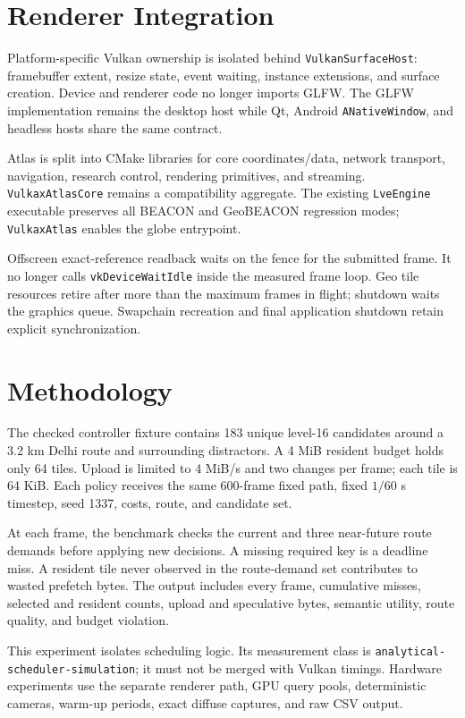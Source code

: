 \documentclass[12pt]{article}
\begin{document}
\section{Renderer Integration}
Platform-specific Vulkan ownership is isolated behind \texttt{VulkanSurfaceHost}: framebuffer
extent, resize state, event waiting, instance extensions, and surface creation. Device and renderer
code no longer imports GLFW. The GLFW implementation remains the desktop host while Qt, Android
\texttt{ANativeWindow}, and headless hosts share the same contract.

Atlas is split into CMake libraries for core coordinates/data, network transport, navigation,
research control, rendering primitives, and streaming. \texttt{VulkaxAtlasCore} remains a
compatibility aggregate. The existing \texttt{LveEngine} executable preserves all BEACON and
GeoBEACON regression modes; \texttt{VulkaxAtlas} enables the globe entrypoint.

Offscreen exact-reference readback waits on the fence for the submitted frame. It no longer calls
\texttt{vkDeviceWaitIdle} inside the measured frame loop. Geo tile resources retire after more than
the maximum frames in flight; shutdown waits the graphics queue. Swapchain recreation and final
application shutdown retain explicit synchronization.

\section{Methodology}
The checked controller fixture contains 183 unique level-16 candidates around a 3.2 km Delhi route
and surrounding distractors. A 4 MiB resident budget holds only 64 tiles. Upload is limited to
4 MiB/s and two changes per frame; each tile is 64 KiB. Each policy receives the same 600-frame
fixed path, fixed $1/60$ s timestep, seed 1337, costs, route, and candidate set.

At each frame, the benchmark checks the current and three near-future route demands before applying
new decisions. A missing required key is a deadline miss. A resident tile never observed in the
route-demand set contributes to wasted prefetch bytes. The output includes every frame, cumulative
misses, selected and resident counts, upload and speculative bytes, semantic utility, route
quality, and budget violation.

This experiment isolates scheduling logic. Its measurement class is
\texttt{analytical-scheduler-simulation}; it must not be merged with Vulkan timings. Hardware
experiments use the separate renderer path, GPU query pools, deterministic cameras, warm-up
periods, exact diffuse captures, and raw CSV output.
\end{document}
